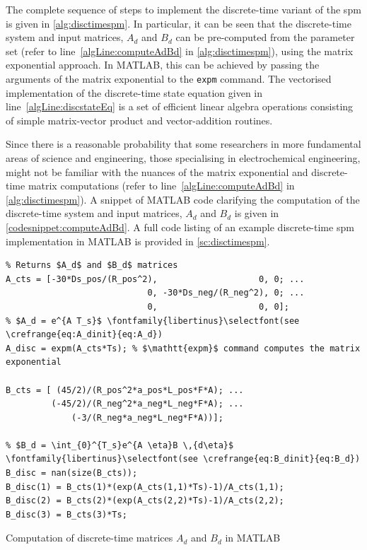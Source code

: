 The complete  sequence of steps  to implement  the discrete-time variant  of the
\gls{spm}  is given  in \cref{alg:disctimespm}. In  particular, it  can be  seen
that  the discrete-time  system  and  input matrices,  $A_d$  and  $B_d$ can  be
pre-computed  from the  parameter set  (refer to  line~\ref{algLine:computeAdBd}
in \cref{alg:disctimespm}),   using   the   matrix  exponential   approach.   In
\textsc{MATLAB}, this  can be achieved  by passing  the arguments of  the matrix
exponential to  the \verb+expm+  command. The  vectorised implementation  of the
discrete-time state equation given in line~\ref{algLine:discstateEq} is a set of
efficient linear  algebra operations consisting of  simple matrix-vector product
and vector-addition routines.



Since  there  is  a  reasonable   probability  that  some  researchers  in  more
fundamental  areas   of  science  and  engineering,   \eg{}  those  specialising
in  electrochemical  engineering,  might  not   be  familiar  with  the  nuances
of  the   matrix  exponential  and  discrete-time   matrix  computations  (refer
to  line~\ref{algLine:computeAdBd}  in \cref{alg:disctimespm}).   A  snippet  of
\textsc{MATLAB} code clarifying the computation  of the discrete-time system and
input matrices,  $A_d$ and  $B_d$ is given  in \cref{codesnippet:computeAdBd}. A
full  code  listing of  an  example  discrete-time \gls{spm}  implementation  in
\textsc{MATLAB} is provided in \cref{sc:disctimespm}.

\begin{listing}
\begin{verbatim}
% Returns $A_d$ and $B_d$ matrices
A_cts = [-30*Ds_pos/(R_pos^2),                    0, 0; ...
                            0, -30*Ds_neg/(R_neg^2), 0; ...
                            0,                    0, 0];
% $A_d = e^{A T_s}$ \fontfamily{libertinus}\selectfont(see \crefrange{eq:A_dinit}{eq:A_d})
A_disc = expm(A_cts*Ts); % $\mathtt{expm}$ command computes the matrix exponential

B_cts = [ (45/2)/(R_pos^2*a_pos*L_pos*F*A); ...
         (-45/2)/(R_neg^2*a_neg*L_neg*F*A); ...
             (-3/(R_neg*a_neg*L_neg*F*A))];

% $B_d = \int_{0}^{T_s}e^{A \eta}B \,{d\eta}$ \fontfamily{libertinus}\selectfont(see \crefrange{eq:B_dinit}{eq:B_d})
B_disc = nan(size(B_cts));
B_disc(1) = B_cts(1)*(exp(A_cts(1,1)*Ts)-1)/A_cts(1,1);
B_disc(2) = B_cts(2)*(exp(A_cts(2,2)*Ts)-1)/A_cts(2,2);
B_disc(3) = B_cts(3)*Ts;
\end{verbatim}
\caption{Computation of discrete-time matrices $A_d$ and $B_d$ in
\textsc{MATLAB}}
\label{codesnippet:computeAdBd}
\end{listing}

